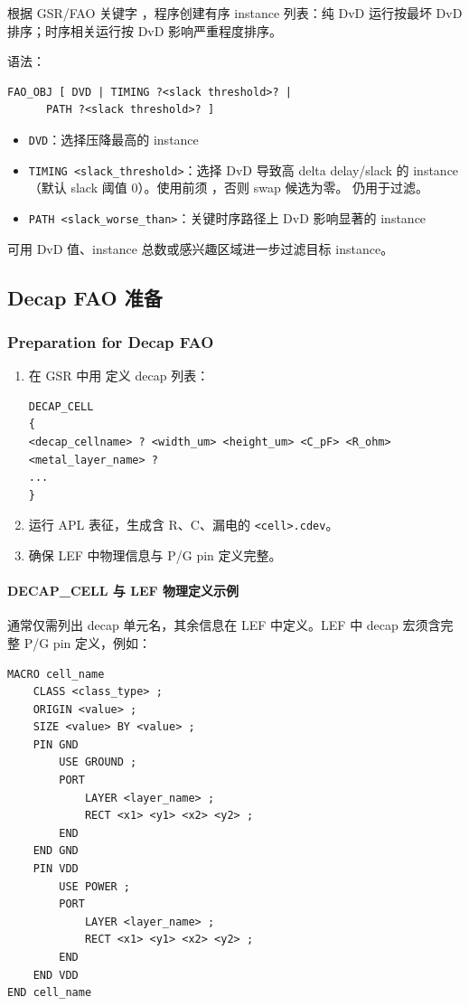 \label{fig:rh-fao-flow}

根据 GSR/FAO 关键字 ，程序创建有序 instance 列表：纯 DvD 运行按最坏 DvD 排序；时序相关运行按 DvD 影响严重程度排序。

 语法：
\begin{lstlisting}
FAO_OBJ [ DVD | TIMING ?<slack threshold>? |
      PATH ?<slack threshold>? ]
\end{lstlisting}
\begin{itemize}
  \item \texttt{DVD}：选择压降最高的 instance
  \item \texttt{TIMING <slack\_threshold>}：选择 DvD 导致高 delta delay/slack 的 instance（默认 slack 阈值 0）。使用前须 ，否则 swap 候选为零。 仍用于过滤。
  \item \texttt{PATH <slack\_worse\_than>}：关键时序路径上 DvD 影响显著的 instance
\end{itemize}

可用 DvD 值、instance 总数或感兴趣区域进一步过滤目标 instance。

\subsection{Decap FAO 准备}
\subsubsection*{Preparation for Decap FAO}

\begin{enumerate}
  \item 在 GSR 中用  定义 decap 列表：
\begin{lstlisting}
DECAP_CELL
{
<decap_cellname> ? <width_um> <height_um> <C_pF> <R_ohm>
<metal_layer_name> ?
...
}
\end{lstlisting}
  \item 运行 APL 表征，生成含 R、C、漏电的 \texttt{<cell>.cdev}。
  \item 确保 LEF 中物理信息与 P/G pin 定义完整。
\end{enumerate}
\paragraph{DECAP\_CELL 与 LEF 物理定义示例}
 通常仅需列出 decap 单元名，其余信息在 LEF 中定义。LEF 中 decap 宏须含完整 P/G pin 定义，例如：
\begin{lstlisting}
MACRO cell_name
    CLASS <class_type> ;
    ORIGIN <value> ;
    SIZE <value> BY <value> ;
    PIN GND
        USE GROUND ;
        PORT
            LAYER <layer_name> ;
            RECT <x1> <y1> <x2> <y2> ;
        END
    END GND
    PIN VDD
        USE POWER ;
        PORT
            LAYER <layer_name> ;
            RECT <x1> <y1> <x2> <y2> ;
        END
    END VDD
END cell_name
\end{lstlisting}


